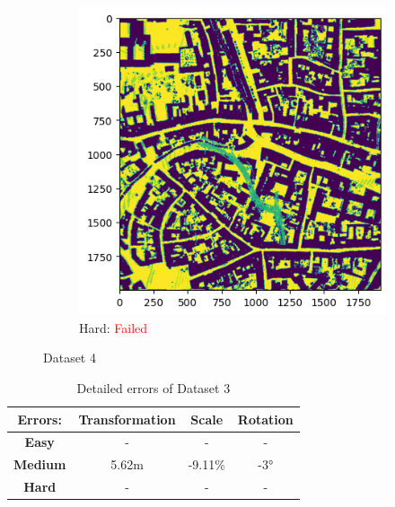 \documentclass[11pt]{article}
\begin{document}
\begin{figure}[p]
        \vspace{1em}

        \begin{subfigure}{0.45\textwidth}
            \centering
            \includegraphics[width=\linewidth]{images/full/hard/4_0_1_hard}
            \caption{Hard: \textcolor{red}{Failed}}
            \label{fig:4_0_1_hard}
        \end{subfigure}
        \hfill

        \caption{Dataset 4}
        \label{fig:res_4_0_1}
    \end{figure}

    \begin{table}[p]
        \centering
        \begin{tabular}{|c|c|c|c|}
          \hline
          \textbf{Errors:} & \textbf{Transformation} & \textbf{Scale} & \textbf{Rotation} \\
          \hline
          \textbf{Easy}   & -  & - & - \\
          \hline
          \textbf{Medium} & 5.62m  & -9.11\% & -3° \\
          \hline
          \textbf{Hard}   & -  & - & - \\
          \hline
        \end{tabular}
        \caption{Detailed errors of Dataset 3}
        \label{tab:tab_4}
    \end{table}
\end{document}
